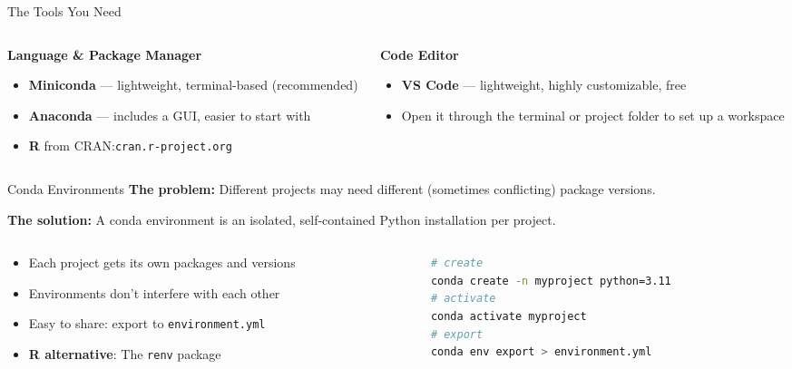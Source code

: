 \documentclass[13pt, aspectratio=169]{beamer}
\begin{document}
\begin{frame}{The Tools You Need}
    \begin{columns}
        \begin{column}{0.48\textwidth}
            \textbf{Language \& Package Manager}
            \begin{itemize}
                \item \textbf{Miniconda} — lightweight, terminal-based (recommended)
                \item \textbf{Anaconda} — includes a GUI, easier to start with
                \item \textbf{R} from CRAN:\@ \texttt{cran.r-project.org}
            \end{itemize}
        \end{column}
        \begin{column}{0.48\textwidth}
            \textbf{Code Editor}
            \begin{itemize}
                \item \textbf{VS Code} — lightweight, highly customizable, free
                \item Open it through the terminal or project folder to set up a workspace
            \end{itemize}
        \end{column}
    \end{columns}
\end{frame}

\begin{frame}[fragile]{Conda Environments}
    \textbf{The problem:} Different projects may need different (sometimes conflicting) package versions.

    \vspace{0.3em}
    \textbf{The solution:} A \alert{conda environment} is an isolated, self-contained Python installation per project.

    \begin{columns}
        \begin{column}{0.48\textwidth}
            \begin{itemize}
                \item Each project gets its own packages and versions
                \item Environments don't interfere with each other
                \item Easy to share: export to \texttt{environment.yml}
                \item \textbf{R alternative}: The \texttt{renv} package
            \end{itemize}
        \end{column}
        \begin{column}{0.48\textwidth}
\begin{lstlisting}[language=bash]
# create
conda create -n myproject python=3.11
# activate
conda activate myproject
# export
conda env export > environment.yml
\end{lstlisting}
        \end{column}
    \end{columns}
\end{frame}
\end{document}
